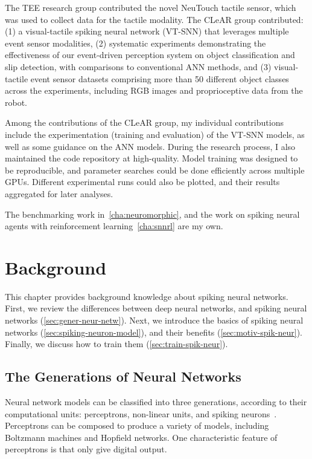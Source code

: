 \documentclass[fyp]{socreport}
\begin{document}
The TEE research group contributed the novel NeuTouch tactile sensor, which was
used to collect data for the tactile modality. The CLeAR group contributed: (1) a
visual-tactile spiking neural network (VT-SNN) that leverages multiple event
sensor modalities, (2) systematic experiments demonstrating the effectiveness of
our event-driven perception system on object classification and slip detection,
with comparisons to conventional ANN methods, and (3) visual-tactile event
sensor datasets comprising more than 50 different object classes across the
experiments, including RGB images and proprioceptive data from the robot.

Among the contributions of the CLeAR group, my individual contributions include
the experimentation (training and evaluation) of the VT-SNN models, as well as
some guidance on the ANN models. During the research process, I
also maintained the code repository at high-quality. Model training was designed
to be reproducible, and parameter searches could be done efficiently across
multiple GPUs. Different experimental runs could also be plotted, and their
results aggregated for later analyses.

The benchmarking work in~\autoref{cha:neuromorphic}, and the work on spiking
neural agents with reinforcement learning~\autoref{cha:snnrl} are my own.

\chapter{Background\label{cha:background}}

This chapter provides background knowledge about spiking neural networks. First,
we review the differences between deep neural networks, and spiking neural
networks (\ref{sec:gener-neur-netw}). Next, we introduce the basics of spiking
neural networks (\ref{sec:spiking-neuron-model}), and their benefits
(\ref{sec:motiv-spik-neur}). Finally, we discuss how to train them
(\ref{sec:train-spik-neur}).

\section{The Generations of Neural Networks\label{sec:gener-neur-netw}}

Neural network models can be classified into three generations, according to
their computational units: perceptrons, non-linear units, and spiking
neurons~\cite{MAASS19971659}. Perceptrons can be composed to produce a variety
of models, including Boltzmann machines and Hopfield networks. One
characteristic feature of perceptrons is that only give digital output.
\end{document}
